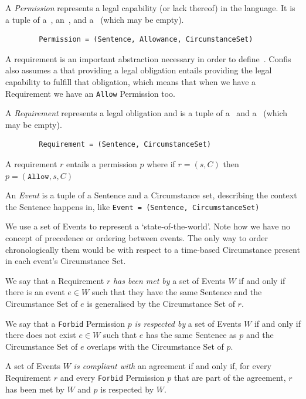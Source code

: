 \begin{definition}[Permission]
    \label{def:permission} A \emph{Permission} represents a legal capability (or lack thereof) in the language.
    It is a tuple of a~, an~, and a~ (which may be empty).
    \begin{verbatim}
        Permission = (Sentence, Allowance, CircumstanceSet)
    \end{verbatim}
\end{definition}

A requirement is an important abstraction necessary in order to define~.
Confis also assumes a that providing a legal obligation entails providing the legal capability to fulfill that obligation, which means that when we have a Requirement we have an \texttt{Allow} Permission too.

\begin{definition}[Requirement]
    \label{def:requirement} A \emph{Requirement} represents a legal obligation and is a tuple of a~ and a~ (which may be empty).
    \begin{verbatim}
        Requirement = (Sentence, CircumstanceSet)
    \end{verbatim}

    A requirement $r$ entails a permission $p$ where if $r = (s, C)$ then $p = (\texttt{Allow}, s, C)$
\end{definition}

\begin{definition}[Event]
    \label{def:event}
    An \emph{Event} is a tuple of a Sentence and a Circumstance set, describing the context the Sentence happens in, like \texttt{Event = (Sentence, CircumstanceSet)}
\end{definition}

We use a set of Events to represent a `state-of-the-world'.
Note how we have no concept of precedence or ordering between events.
The only way to order chronologically them would be with respect to a time-based Circumstance present in each event's Circumstance Set.

\begin{definition}[Compliance]
    \label{def:confis-compliance}
    We say that a Requirement $r$ \emph{has been met by} a set of Events $W$ if and only if there is an event $e \in W$ such that they have the same Sentence and the Circumstance Set of $e$ is generalised by the Circumstance Set of $r$.

    We say that a \texttt{Forbid} Permission $p$ \emph{is respected by} a set of Events $W$ if and only if there does not exist $e \in W$ such that $e$ has the same Sentence as $p$ and the Circumstance Set of $e$ overlaps with the Circumstance Set of $p$.

    A set of Events $W$ \emph{is compliant with} an agreement if and only if, for every Requirement $r$ and every \texttt{Forbid} Permission $p$ that are part of the agreement, $r$ has been met by $W$ and $p$ is respected by $W$.
\end{definition}

